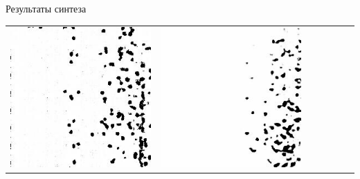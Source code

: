 \documentclass[12pt]{beamer}
\begin{document}
\begin{frame}{Результаты синтеза}
\begin{table}
\begin{center}
\begin{tabular}{p{1.2cm} p{1.2cm} p{1.2cm} p{1.2cm} p{1.2cm} p{1.2cm} p{1.2cm}}
					\includegraphics[width=1\linewidth]{8-results/sand-trend2/nf16/gen3}
					&
					\includegraphics[width=1\linewidth]{8-results/sand-trend2/nf16_woUnet/gen3}
					&

\end{tabular}
\end{center}
\end{table}
\end{frame}
\end{document}

